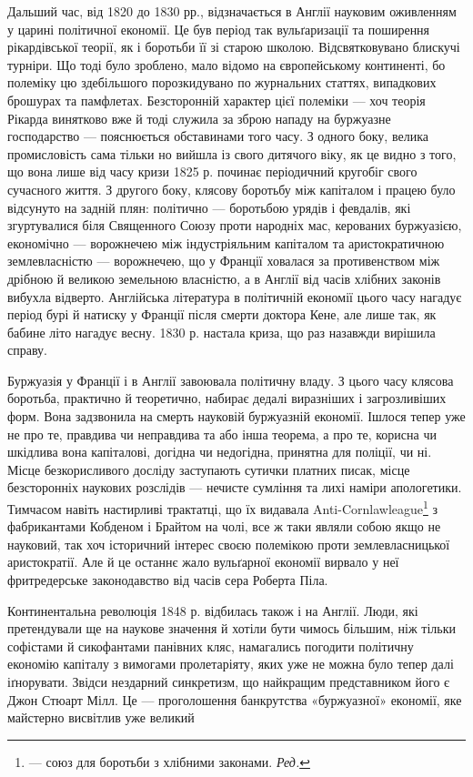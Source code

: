 Дальший час, від 1820 до 1830 рр., відзначається в Англії науковим
оживленням у царині політичної економії. Це був період
так вульґаризації та поширення рікардівської теорії, як і боротьби
її зі старою школою. Відсвятковувано блискучі турніри.
Що тоді було зроблено, мало відомо на європейському континенті,
бо полеміку цю здебільшого порозкидувано по журнальних
статтях, випадкових брошурах та памфлетах. Безсторонній характер
цієї полеміки — хоч теорія Рікарда винятково вже й тоді
служила за зброю нападу на буржуазне господарство — пояснюється
обставинами того часу. З одного боку, велика промисловість
сама тільки но вийшла із свого дитячого віку, як це видно з того,
що вона лише від часу кризи 1825 р. починає періодичний кругобіг
свого сучасного життя. З другого боку, клясову боротьбу між
капіталом і працею було відсунуто на задній плян: політично —
боротьбою урядів і февдалів, які згуртувалися біля Священного
Союзу проти народніх мас, керованих буржуазією, економічно —
ворожнечею між індустріяльним капіталом та аристократичною
землевласністю — ворожнечею, що у Франції ховалася за противенством
між дрібною й великою земельною власністю, а в Англії
від часів хлібних законів вибухла відверто. Англійська література
в політичній економії цього часу нагадує період бурі й натиску
у Франції після смерти доктора Кене, але лише так, як
бабине літо нагадує весну. 1830 р. настала криза, що раз назавжди
вирішила справу.

Буржуазія у Франції і в Англії завоювала політичну владу.
З цього часу клясова боротьба, практично й теоретично, набирає
дедалі виразніших і загрозливіших форм. Вона задзвонила
на смерть науковій буржуазній економії. Ішлося тепер уже
не про те, правдива чи неправдива та або інша теорема, а про те,
корисна чи шкідлива вона капіталові, догідна чи недогідна, принятна
для поліції, чи ні. Місце безкорисливого досліду заступають
сутички платних писак, місце безсторонніх наукових розслідів —
нечисте сумління та лихі наміри апологетики. Тимчасом навіть
настирливі трактатці, що їх видавала Anti-Cornlawleague\footnote*{
— союз для боротьби з хлібними законами. \emph{Ред.}
} з
фабрикантами Кобденом і Брайтом на чолі, все ж таки являли
собою якщо не науковий, так хоч історичний інтерес своєю полемікою
проти землевласницької аристократії. Але й це останнє
жало вульґарної економії вирвало у неї фритредерське законодавство
від часів сера Роберта Піла.

Континентальна революція 1848 р. відбилась також і на Англії.
Люди, які претендували ще на наукове значення й хотіли бути
чимось більшим, ніж тільки софістами й сикофантами панівних
кляс, намагались погодити політичну економію капіталу з вимогами
пролетаріяту, яких уже не можна було тепер далі іґнорувати.
Звідси нездарний синкретизм, що найкращим представником
його є Джон Стюарт Мілл. Це — проголошення банкрутства
«буржуазної» економії, яке майстерно висвітлив уже великий
